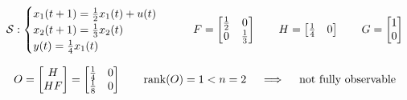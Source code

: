\begin{example}[SISO system of order $n=2$]
    \begin{align*}
    \mathcal{S}: 
        \begin{cases}
            x_1(t+1) = \frac{1}{2} x_1(t) + u(t) \\
            x_2(t+1) = \frac{1}{3}x_2(t) \\
            y(t) = \frac{1}{4}x_1(t)
        \end{cases}
        \qquad
        F = \begin{bmatrix}
            \frac{1}{2} & 0 \\
            0 & \frac{1}{3}
        \end{bmatrix}
        \qquad
        H = \begin{bmatrix}
            \frac{1}{4} & 0
        \end{bmatrix}
        \qquad
        G = \begin{bmatrix}
            1 \\
            0
        \end{bmatrix}
    \end{align*}

    \[
        O = \begin{bmatrix}
            H \\
            HF
        \end{bmatrix} = \begin{bmatrix}
            \frac{1}{4} & 0 \\
            \frac{1}{8} & 0
        \end{bmatrix}
        \qquad
        \operatorname*{rank} (O) = 1 < n = 2
        \quad\implies\quad \text{not fully observable}
    \]


\end{example}
